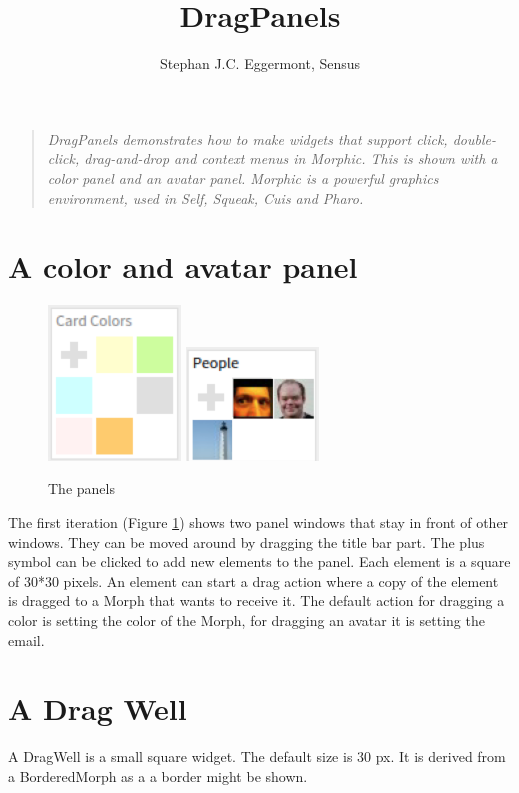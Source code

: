 \documentclass[10pt, twoside]{article}   	%
\title{DragPanels}
\author{Stephan J.C. Eggermont, Sensus}
\begin{document}
\setlength{\parindent}{0pt}
\maketitle
\begin{quote}
\em
DragPanels demonstrates how to make widgets that support click, double-click, drag-and-drop
and context menus in Morphic. This is shown with a color panel and an avatar panel.
Morphic is a powerful graphics environment, used in Self, Squeak, Cuis and Pharo.
\end{quote} 
\section{A color and avatar panel}
\begin{figure}[htb]
\begin{center}
\includegraphics[width=100pt]{CardColors.png}
\includegraphics[width=100pt]{Avatars.png}
\caption{The panels}
\label{1stIteration}
\end{center}
\end{figure}
The first iteration (Figure \ref{1stIteration})  shows two panel windows that
stay in front of other windows. They can be moved around  by dragging
the title bar part. The plus symbol can be clicked to add new elements
to the panel. Each element is a square of 30*30 pixels. An element can 
start a drag action where a copy of the element is dragged to a Morph that
wants to receive it. The default action for dragging a color is setting the color
of the Morph, for dragging an avatar it is setting the email.
\section{A Drag Well}
A DragWell is a small square widget. The default size is 30 px. It is derived from a 
BorderedMorph as a a border might be shown.
\end{document}
